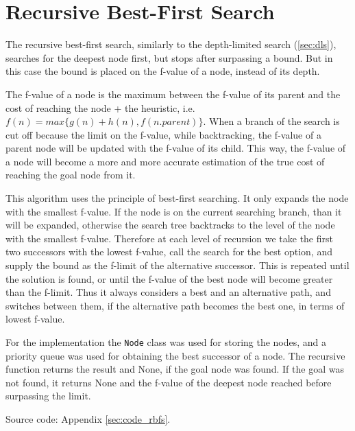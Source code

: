 \chapter{Recursive Best-First Search} 

The recursive best-first search, similarly to the depth-limited search (\ref{sec:dls}), searches for the deepest node first, but stops after surpassing a bound. But in this case the bound is placed on the f-value of a node, instead of its depth.

The f-value of a node is the maximum between the f-value of its parent and the cost of reaching the node + the heuristic, i.e. $f(n) = max\{ g(n) + h(n), f(n.parent) \}$. When a branch of the search is cut off because the limit on the f-value, while backtracking, the f-value of a parent node will be updated with the f-value of its child. This way, the f-value of a node will become a more and more accurate estimation of the true cost of reaching the goal node from it.

This algorithm uses the principle of best-first searching. It only expands the node with the smallest f-value. If the node is on the current searching branch, than it will be expanded, otherwise the search tree backtracks to the level of the node with the smallest f-value. Therefore at each level of recursion we take the first two successors with the lowest f-value, call the search for the best option, and supply the bound as the f-limit of the alternative successor. This is repeated until the solution is found, or until the f-value of the best node will become greater than the f-limit. Thus it always considers a best and an alternative path, and switches between them, if the alternative path becomes the best one, in terms of lowest f-value.

For the implementation the \verb|Node| class was used for storing the nodes, and a priority queue was used for obtaining the best successor of a node. The recursive function returns the result and None, if the goal node was found. If the goal was not found, it returns None and the f-value of the deepest node reached before surpassing the limit.

Source code: Appendix \ref{sec:code_rbfs}.

